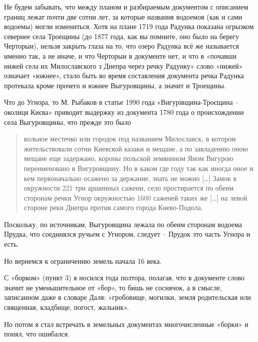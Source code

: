 
Не будем забывать, что между планом и разбираемым документом с описанием границ лежат почти две сотни лет, за которые названия водоемов (как и сами водоемы) могли измениться. Хотя на плане 1719 года Радунка показана огрызком севернее села Троещины (до 1877 года, как вы помните, оно было на берегу Черторыи), нельзя закрыть глаза на то, что озеро Радунка всё же называется именно так, а не иначе, и что Черторыи в документе нет, и что в «почавши нижей села их Милославского з Днепра через речку Радунку» слово «нижей» означает «южнее», стало быть во время составления документа речка Радунка протекала кроме прочего и южнее Выгуровщины, а значит и Троещины.

Что до Угнора, то М. Рыбаков в статье 1990 года «Вигурівщина-Троєщина – околиця Києва» приводит выдержку из документа 1780 года о происхождении села Выгуровщины, что прежде это было

\begin{quotation}
вольное местечко или городок под названием Милославск, в котором жительствовали сотни Киевской казаки и мещане, а по завладению оною мещане еще задержано, короны польской земянином Яном Вигурою переименовано в Вигуровщину. Но в каком где году так как иногда оное и кем первоначально осажено за держание, знать не можно […] Замок в окружности 221 три аршинных сажени, село простирается по обеим сторонам речки Угнор окружностью 1600 саженей таких же […] на левой стороне реки Днепра против самого города Киево-Подола.
\end{quotation} 

Поскольку, по источникам, Выгуровщина лежала по обеим сторонам водоема Прудка, что соединялся ручьем с Угнором, следует – Прудок это часть Угнора и есть.
 
Но вернемся к ограничению земель начала 16 века.

С «борком» (пункт 3) я носился года полтора, полагая, что в документе слово значит не уменьшительное от «бор», то бишь не соснячок, а в смысле, записанном даже в словаре Даля: «гробовище, могилки, земля родительская или священная, кладбище, погост, жальник».

Но потом я стал встречать в земельных документах многочисленные «борки» и понял, что ошибался.

